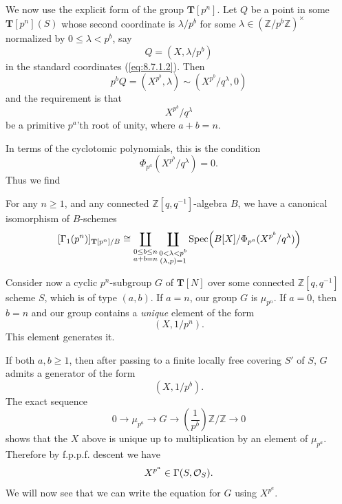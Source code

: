 We now use the explicit form of the group $\mathbf{T}[p^n]$. Let $Q$ be a point in some $\mathbf{T}[p^n](S)$ whose second coordinate is $\lambda/p^b$ for some $\lambda \in (\mathbb{Z}/p^b\mathbb{Z})^\times$ normalized by $0 \le \lambda < p^b$, say
\[
Q = (X, \lambda/p^b)
\]
in the standard coordinates (\ref{eq:8.7.1.2}). Then
\[
p^b Q = (X^{p^b}, \lambda) \sim (X^{p^b}/q^\lambda, 0)
\]
and the requirement is that
\[
X^{p^b}/q^\lambda
\]
be a primitive $p^a$'th root of unity, where $a + b = n$.

In terms of the cyclotomic polynomials, this is the condition
\[
\Phi_{p^a}(X^{p^b}/q^\lambda) = 0 .
\]
Thus we find

\begin{kthm}\label{thm:13.6.4}
For any $n \ge 1$, and any connected $\mathbb{Z}[q,q^{-1}]$-algebra $B$, we have a canonical isomorphism of $B$-schemes
\[
[\Gamma_1(p^n)]_{\mathbf{T}[p^n]/B} \cong \coprod_{\substack{0 \le b \le n \\ a + b = n}} \coprod_{\substack{0 < \lambda < p^b \\ (\lambda, p) = 1}} \operatorname{Spec}\!\left(B[X]/\Phi_{p^a}(X^{p^b}/q^\lambda)\right)
\]
\end{kthm}

\kmitem\label{item:13.6.5}Consider now a cyclic $p^n$-subgroup $G$ of $\mathbf{T}[N]$ over some connected $\mathbb{Z}[q,q^{-1}]$ scheme $S$, which is of type $(a,b)$. If $a = n$, our group $G$ is $\mu_{p^n}$. If $a = 0$, then $b = n$ and our group contains a \emph{unique} element of the form
\[
(X, 1/p^n) .
\]
This element generates it.

If both $a, b \ge 1$, then after passing to a finite locally free covering $S'$ of $S$, $G$ admits a generator of the form
\[
(X, 1/p^b) .
\]
The exact sequence
\[
0 \to \mu_{p^a} \to G \to \left(\frac{1}{p^b}\right)\mathbb{Z}/\mathbb{Z} \to 0
\]
shows that the $X$ above is unique up to multiplication by an element of $\mu_{p^a}$. Therefore by f.p.p.f. descent we have
\[
X^{p^a} \in \Gamma(S, \mathcal{O}_S) .
\]
We will now see that we can write the equation for $G$ using $X^{p^a}$.

